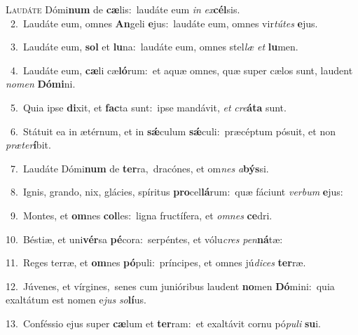 \lettrine{\initial\textcolor{\initialcolor}{L}}{audáte} Dómi\textbf{num} de \textbf{cæ}\-lis:~\star laudáte eum \textit{in} \textit{ex}\-\textbf{cél}sis.\\
{\numbfont\textcolor{\numbcolor}{~2.}}~Laudáte eum, omnes \textbf{An}\-geli \textbf{e}\-jus:~\star laudáte eum, omnes vir\-\textit{tú}\-\textit{tes} \textbf{e}\-jus.\par
{\numbfont\textcolor{\numbcolor}{~3.}}~Laudáte eum, \textbf{sol} et \textbf{lu}\-na:~\star laudáte eum, omnes stel\textit{læ} \textit{et} \textbf{lu}\-men.\par
{\numbfont\textcolor{\numbcolor}{~4.}}~Laudáte eum, \textbf{cæ}\-li cæ\-\textbf{ló}\-rum:~\star et aquæ omnes, quæ super cælos sunt, laudent \textit{no}\-\textit{men} \textbf{Dó}\-\textbf{mi}ni.\par
{\numbfont\textcolor{\numbcolor}{~5.}}~Quia ipse \textbf{di}\-xit, et \textbf{fac}\-ta sunt:~\star ipse mandávit, \textit{et} \textit{cre}\-\textbf{á}\textbf{ta} sunt.\par
{\numbfont\textcolor{\numbcolor}{~6.}}~Státuit ea in ætérnum, et in \textbf{sǽ}\-culum \textbf{sǽ}\-culi:~\star præcéptum pósuit, et non \textit{præ}\-\textit{ter}\textbf{í}bit.\par
{\numbfont\textcolor{\numbcolor}{~7.}}~Laudáte Dómi\textbf{num} de \textbf{ter}\-ra,~\star dracónes, et om\textit{nes} \textit{a}\-\textbf{býs}si.\par
{\numbfont\textcolor{\numbcolor}{~8.}}~Ignis, grando, nix, glácies, spíritus \textbf{pro}\-cel\-\textbf{lá}\-rum:~\star quæ fáciunt \textit{ver}\-\textit{bum} \textbf{e}\-jus:\par
{\numbfont\textcolor{\numbcolor}{~9.}}~Montes, et \textbf{om}\-nes \textbf{col}\-les:~\star ligna fructífera, et \textit{om}\-\textit{nes} \textbf{ce}\-dri.\par
{\numbfont\textcolor{\numbcolor}{10.}}~Béstiæ, et uni\-\textbf{vér}\-sa \textbf{pé}\-cora:~\star serpéntes, et vólu\textit{cres} \textit{pen}\-\textbf{ná}tæ:\par
{\numbfont\textcolor{\numbcolor}{11.}}~Reges terræ, et \textbf{om}\-nes \textbf{pó}\-puli:~\star príncipes, et omnes jú\-\textit{di}\-\textit{ces} \textbf{ter}\-ræ.\par
{\numbfont\textcolor{\numbcolor}{12.}}~Júvenes, et vírgines,~\dagger senes cum junióribus laudent \textbf{no}\-men \textbf{Dó}\-mini:~\star quia exaltátum est nomen e\textit{jus} \textit{so}\-\textbf{lí}us.\par
{\numbfont\textcolor{\numbcolor}{13.}}~Conféssio ejus super \textbf{cæ}\-lum et \textbf{ter}\-ram:~\star et exaltávit cornu pó\-\textit{pu}\-\textit{li} \textbf{su}\-i.\par
